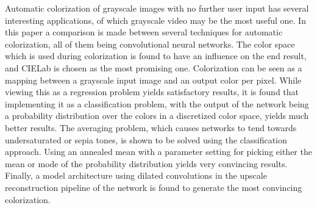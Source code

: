 Automatic colorization of grayscale images with no further user input has several interesting applications, of which grayscale video may be the most useful one. In this paper a comparison is made between several techniques for automatic colorization, all of them being convolutional neural networks. The color space which is used during colorization is found to have an influence on the end result, and CIELab is chosen as the most promising one. Colorization can be seen as a mapping between a grayscale input image and an output color per pixel. While viewing this as a regression problem yields satisfactory results, it is found that implementing it as a classification problem, with the output of the network being a probability distribution over the colors in a discretized color space, yields much better results. The averaging problem, which causes networks to tend towards undersaturated or sepia tones, is shown to be solved using the classification approach. Using an annealed mean with a parameter setting for picking either the mean or mode of the probability distribution yields very convincing results. Finally, a model architecture using dilated convolutions in the upscale reconstruction pipeline of the network is found to generate the most convincing colorization.

